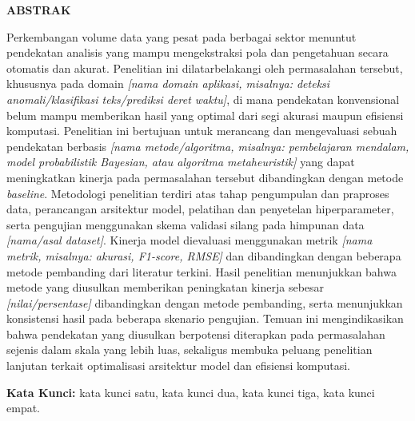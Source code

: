 \thispagestyle{empty}
\begin{center}
{\bfseries ABSTRAK\par}
\vspace{10mm}
\end{center}

\noindent Perkembangan volume data yang pesat pada berbagai sektor menuntut pendekatan analisis yang mampu mengekstraksi pola dan pengetahuan secara otomatis dan akurat. Penelitian ini dilatarbelakangi oleh permasalahan tersebut, khususnya pada domain \textit{[nama domain aplikasi, misalnya: deteksi anomali/klasifikasi teks/prediksi deret waktu]}, di mana pendekatan konvensional belum mampu memberikan hasil yang optimal dari segi akurasi maupun efisiensi komputasi. Penelitian ini bertujuan untuk merancang dan mengevaluasi sebuah pendekatan berbasis \textit{[nama metode/algoritma, misalnya: pembelajaran mendalam, model probabilistik Bayesian, atau algoritma metaheuristik]} yang dapat meningkatkan kinerja pada permasalahan tersebut dibandingkan dengan metode \textit{baseline}. Metodologi penelitian terdiri atas tahap pengumpulan dan praproses data, perancangan arsitektur model, pelatihan dan penyetelan hiperparameter, serta pengujian menggunakan skema validasi silang pada himpunan data \textit{[nama/asal dataset]}. Kinerja model dievaluasi menggunakan metrik \textit{[nama metrik, misalnya: akurasi, F1-score, RMSE]} dan dibandingkan dengan beberapa metode pembanding dari literatur terkini. Hasil penelitian menunjukkan bahwa metode yang diusulkan memberikan peningkatan kinerja sebesar \textit{[nilai/persentase]} dibandingkan dengan metode pembanding, serta menunjukkan konsistensi hasil pada beberapa skenario pengujian. Temuan ini mengindikasikan bahwa pendekatan yang diusulkan berpotensi diterapkan pada permasalahan sejenis dalam skala yang lebih luas, sekaligus membuka peluang penelitian lanjutan terkait optimalisasi arsitektur model dan efisiensi komputasi.

\vspace{6mm}
\noindent\textbf{Kata Kunci:} kata kunci satu, kata kunci dua, kata kunci tiga, kata kunci empat.
\clearpage
